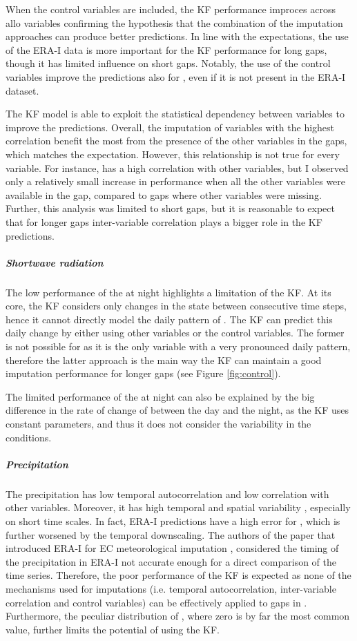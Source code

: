 \documentclass{article}
\begin{document}
When the control variables are included, the KF performance improces across allo variables confirming the hypothesis that the combination of the imputation approaches can produce better predictions. In line with the expectations, the use of the ERA-I data is more important for the KF performance for long gaps, though it has limited influence on short gaps. Notably, the use of the control variables improve the predictions also for , even if it is not present in the ERA-I dataset.

The KF model is able to exploit the statistical dependency between variables to improve the predictions. Overall, the imputation of variables with the highest correlation benefit the most from the presence of the other variables in the gaps, which matches the expectation. However, this relationship is not true for every variable. For instance,  has a high correlation with other variables, but I observed only a relatively small increase in performance when all the other variables were available in the gap, compared to gaps where other variables were missing.
Further, this analysis was limited to short gaps, but it is reasonable to expect that for longer gaps inter-variable correlation plays a bigger role in the KF predictions.

\subparagraph{Shortwave radiation} The low performance of the  at night highlights a limitation of the KF.  At its core, the KF considers only changes in the state between consecutive time steps, hence it cannot directly model the daily pattern of . The KF can predict this daily change by either using other variables or the control variables. The former is not possible for  as it is the only variable with a very pronounced daily pattern, therefore the latter approach is the main way the KF can maintain a good imputation performance for longer gaps (see Figure \ref{fig:control}).

The limited performance of the  at night can also be explained by the big difference in the rate of change of  between the day and the night, as the KF uses constant parameters, and thus it does not consider the variability in the  conditions.

\subparagraph{Precipitation} The precipitation has low temporal autocorrelation and low correlation with other variables. Moreover, it has high temporal and spatial variability \cite{mital_sequential_2020}, especially on short time scales. In fact, ERA-I predictions have a high error for , which is further worsened by the temporal downscaling. The authors of the paper that introduced ERA-I for EC meteorological imputation \cite{vuichard_filling_2015}, considered the timing of the precipitation in ERA-I not accurate enough for a direct comparison of the time series.
Therefore, the poor performance of the KF is expected as none of the mechanisms used for imputations (i.e. temporal autocorrelation, inter-variable correlation and control variables) can be effectively applied to gaps in . Furthermore, the peculiar distribution of , where zero is by far the most common value, further limits the potential of using the KF.
\end{document}
